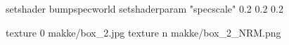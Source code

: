 setshader bumpspecworld
setshaderparam "specscale" 0.2 0.2 0.2

texture 0 makke/box_2.jpg
texture n makke/box_2_NRM.png
